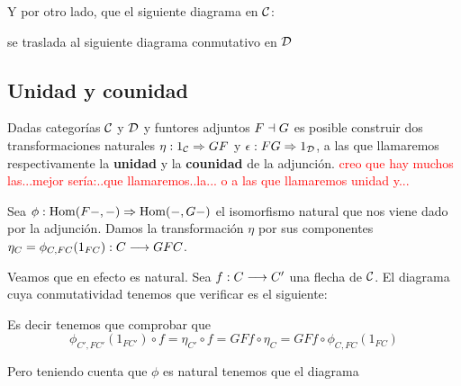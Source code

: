 Y por otro lado, que el siguiente diagrama en $\mathcal{C}$:

\begin{center}
\end{center}

se traslada al siguiente diagrama conmutativo en $\mathcal{D}$

\begin{center}
\end{center}

\subsection{Unidad y counidad}
Dadas categorías $\mathcal{C}$ y $\mathcal{D}$ y funtores adjuntos $F \dashv G$ es
posible construir dos transformaciones naturales
$\eta : 1_{\mathcal{C}}\Rightarrow GF$ y $\epsilon: FG\Rightarrow 1_{\mathcal{D}}$, a las que llamaremos
respectivamente la \textbf{unidad} y la \textbf{counidad} de la
adjunción. \textcolor{red}{creo que hay muchos las...mejor sería:..que llamaremos..la... o a las que llamaremos unidad y...}

Sea $\phi : \operatorname{Hom}(F-, -)\Rightarrow \operatorname{Hom}(-, G-)$ el isomorfismo natural que
nos viene dado por la adjunción. Damos la transformación $\eta$
por sus componentes
$\eta_C = \phi_{C, FC}(1_{FC}) : C\longrightarrow GFC$.

Veamos que en efecto es natural. Sea $f : C\longrightarrow C'$
una flecha de $\mathcal{C}$. El diagrama cuya conmutatividad
tenemos que verificar es el siguiente:

\begin{center}
\end{center}

Es decir tenemos que comprobar que
$$\phi_{C', FC'}(1_{FC'}) \circ f = \eta_{C'} \circ f = GFf \circ \eta_C
  = GFf \circ \phi_{C, FC}(1_{FC})$$

Pero teniendo cuenta que $\phi$ es natural tenemos que el diagrama

